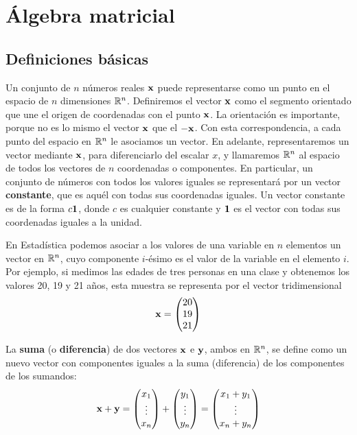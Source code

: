 \chapter{Álgebra matricial}

\section{Definiciones básicas}

Un conjunto de $n$ números reales $\mathbf{x}$ puede representarse como un punto en el espacio de $n$ dimensiones $\mathbb{R}^n$. Definiremos el vector $\mathbf{x}$ como el segmento orientado que une el origen de coordenadas con el punto $\mathbf{x}$. La orientación es importante, porque no es lo mismo el vector $\mathbf{x}$ que el $-\mathbf{x}$. Con esta correspondencia, a cada punto del espacio en $\mathbb{R}^n$ le asociamos un vector. En adelante, representaremos un vector mediante $\mathbf{x}$, para diferenciarlo del escalar $x$, y llamaremos $\mathbb{R}^n$ al espacio de todos los vectores de $n$ coordenadas o componentes. En particular, un conjunto de números con todos los valores iguales se representará por un vector \textbf{constante}, que es aquél con todas sus coordenadas iguales. Un vector constante es de la forma $c\mathbf{1}$, donde $c$ es cualquier constante y $\mathbf{1}$ es el vector con todas sus coordenadas iguales a la unidad.

En Estadística podemos asociar a los valores de una variable en $n$ elementos un vector en $\mathbb{R}^n$, cuyo componente $i$-ésimo es el valor de la variable en el elemento $i$. Por ejemplo, si medimos las edades de tres personas en una clase y obtenemos los valores 20, 19 y 21 años, esta muestra se representa por el vector tridimensional
$$\mathbf{x}=\begin{pmatrix}
    20 \\
    19 \\
    21
\end{pmatrix}$$

La \textbf{suma} (o \textbf{diferencia}) de dos vectores $\mathbf{x}$ e $\mathbf{y}$, ambos en $\mathbb{R}^n$, se define como un nuevo vector con componentes iguales a la suma (diferencia) de los componentes de los sumandos:
$$\mathbf{x} + \mathbf{y}=\begin{pmatrix}
    x_1 \\
    \vdots \\
    x_n
\end{pmatrix}+
\begin{pmatrix}
    y_1 \\
    \vdots \\
    y_n
\end{pmatrix} =
\begin{pmatrix}
    x_1 + y_1 \\
    \vdots \\
    x_n + y_n
\end{pmatrix}$$


